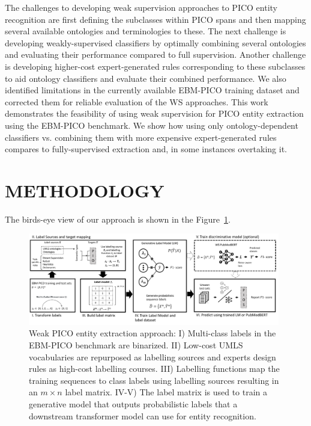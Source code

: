 \documentclass[10.7pt,]{article}
\begin{document}
The challenges to developing weak supervision approaches to PICO entity recognition are first defining the subclasses within PICO spans and then mapping several available ontologies and terminologies to these.
The next challenge is developing weakly-supervised classifiers by optimally combining several ontologies and evaluating their performance compared to full supervision.
Another challenge is developing higher-cost expert-generated rules corresponding to these subclasses to aid ontology classifiers and evaluate their combined performance.
We also identified limitations in the currently available EBM-PICO training dataset and corrected them for reliable evaluation of the WS approaches.
This work demonstrates the feasibility of using weak supervision for PICO entity extraction using the EBM-PICO benchmark.
We show how using only ontology-dependent classifiers vs. combining them with more expensive expert-generated rules compares to fully-supervised extraction and, in some instances overtaking it.
%
\section{\textbf{METHODOLOGY}}\label{methods}
%
The birds-eye view of our approach is shown in the Figure~\ref{fig:approach}.
%
\begin{figure}[ht]
\centering
\includegraphics[width=0.98\textwidth]{figures/approach.pdf}
\caption{Weak PICO entity extraction approach: I) Multi-class labels in the EBM-PICO benchmark are binarized. II) Low-cost UMLS vocabularies are repurposed as labelling sources and experts design rules as high-cost labelling courses. III) Labelling functions map the training sequences to class labels using labelling sources resulting in an $m \times n$ label matrix. IV-V) The label matrix is used to train a generative model that outputs probabilistic labels that a downstream transformer model can use for entity recognition.}
\label{fig:approach}
\end{figure}
%
\end{document}
